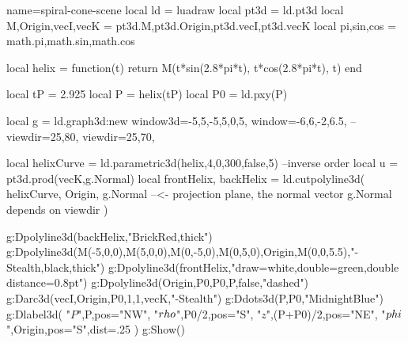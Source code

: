 \documentclass{standalone}
\begin{document}
\begin{luadraw}{name=spiral-cone-scene}
local ld = luadraw
local pt3d = ld.pt3d
local M,Origin,vecI,vecK = pt3d.M,pt3d.Origin,pt3d.vecI,pt3d.vecK
local pi,sin,cos = math.pi,math.sin,math.cos

local helix = function(t)
  return M(t*sin(2.8*pi*t), t*cos(2.8*pi*t), t)
end

local tP = 2.925
local P = helix(tP)
local P0 = ld.pxy(P)

local g = ld.graph3d:new{
  window3d={-5,5,-5,5,0,5},
  window={-6,6,-2,6.5},
  --viewdir={25,80},
  viewdir={25,70},
}

local helixCurve = ld.parametric3d(helix,4,0,300,false,5) --inverse order
local u = pt3d.prod(vecK,g.Normal)
local frontHelix, backHelix = ld.cutpolyline3d(
  helixCurve,
  {Origin, g.Normal} --<- projection plane, the normal vector g.Normal depends on viewdir
)

g:Dpolyline3d(backHelix,"BrickRed,thick")
g:Dpolyline3d({{M(-5,0,0),M(5,0,0)},{M(0,-5,0),M(0,5,0)},{Origin,M(0,0,5.5)}},"-Stealth,black,thick")
g:Dpolyline3d(frontHelix,"draw=white,double=green,double distance=0.8pt")
g:Dpolyline3d({{Origin,P0},{P0,P}},false,"dashed")
g:Darc3d(vecI,Origin,P0,1,1,vecK,"-Stealth")
g:Ddots3d({P,P0},"MidnightBlue")
g:Dlabel3d(
    "$P$",P,{pos="NW"},
    "$\\rho$",P0/2,{pos="S"},
    "$z$",(P+P0)/2,{pos="NE"},
    "$\\phi$",Origin,{pos="S",dist=.25}
)
g:Show()
\end{luadraw}
\end{document}
